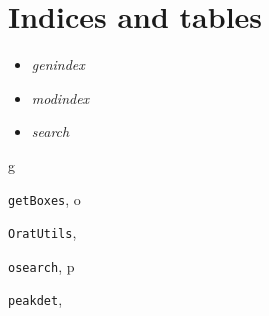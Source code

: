 \documentclass[letterpaper,10pt,english]{sphinxmanual}
\begin{document}
\chapter{Indices and tables}
\label{index:indices-and-tables}\begin{itemize}
\item {} 
\emph{genindex}

\item {} 
\emph{modindex}

\item {} 
\emph{search}

\end{itemize}


\renewcommand{\indexname}{Python Module Index}
\begin{theindex}
\def\bigletter#1{{\Large\sffamily#1}\nopagebreak\vspace{1mm}}
\bigletter{g}
\item {\texttt{getBoxes}}, \pageref{code:module-getBoxes}
\indexspace
\bigletter{o}
\item {\texttt{OratUtils}}, \pageref{code:module-OratUtils}
\item {\texttt{osearch}}, \pageref{code:module-osearch}
\indexspace
\bigletter{p}
\item {\texttt{peakdet}}, \pageref{code:module-peakdet}
\end{theindex}

\renewcommand{\indexname}{Index}
\printindex
\end{document}
